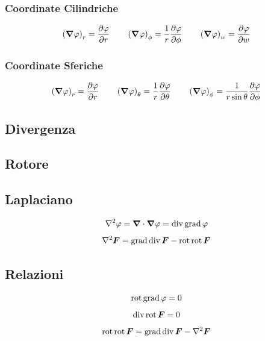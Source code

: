 \subsubsection{Coordinate Cilindriche}
\[\left(\boldsymbol{\nabla}\varphi\right)_r=\frac{\partial\varphi}{\partial r}\qquad\left(\boldsymbol{\nabla}\varphi\right)_\phi=\frac{1}{r}\frac{\partial\varphi}{\partial\phi}\qquad\left(\boldsymbol{\nabla}\varphi\right)_w=\frac{\partial\varphi}{\partial w}\]
\subsubsection{Coordinate Sferiche}
\[\left(\boldsymbol{\nabla}\varphi\right)_r=\frac{\partial\varphi}{\partial r}\qquad\left(\boldsymbol{\nabla}\varphi\right)_\theta=\frac{1}{r}\frac{\partial\varphi}{\partial\theta}\qquad\left(\boldsymbol{\nabla}\varphi\right)_\phi=\frac{1}{r\sin\theta}\frac{\partial\varphi}{\partial\phi}\]
\subsection{Divergenza}
\subsection{Rotore}
\subsection{Laplaciano}
\[\nabla^2\varphi=\boldsymbol{\nabla}\cdot\boldsymbol{\nabla}\varphi=\operatorname{div}\operatorname{grad}\varphi\]
\[\nabla^2\boldsymbol{F}=\operatorname{grad}\operatorname{div}\boldsymbol{F}-\operatorname{rot}\operatorname{rot}\boldsymbol{F}\]
\subsection{Relazioni}
\[\operatorname{rot}\operatorname{grad}\varphi=0\]
\[\operatorname{div}\operatorname{rot}\boldsymbol{F}=0\]
\[\operatorname{rot}\operatorname{rot}\boldsymbol{F}=\operatorname{grad}\operatorname{div}\boldsymbol{F}-\nabla^2\boldsymbol{F}\]